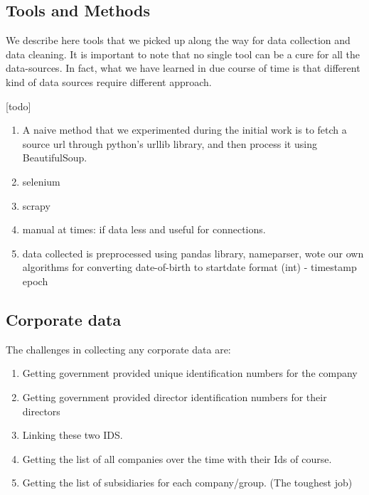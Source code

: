 \subsection{Tools and Methods}

We describe here tools that we picked up along the way for data collection and data cleaning. It is important to note that no single tool can be a cure for all the data-sources. In fact, what we have learned in due course of time is that different kind of data sources require different approach.

[todo]

\begin{enumerate}

    \item A naive method that we experimented during the initial work is to fetch a source url through python's urllib library, and then process it using BeautifulSoup. 

    \item selenium

    \item scrapy

    \item manual at times: if data less and useful for connections. 

    \item data collected is preprocessed using pandas library, nameparser, wote our own algorithms for converting date-of-birth to startdate format (int) -  timestamp epoch

\end{enumerate}


\subsection{Corporate data}

The challenges in collecting any corporate data are:

\begin{enumerate}
    \item Getting government provided unique identification numbers for the company
    \item Getting government provided director identification numbers for their directors
    \item Linking these two IDS.
    \item Getting the list of all companies over the time with their Ids of course.
    \item Getting the list of subsidiaries for each company/group. (The toughest job)
\end{enumerate}  

